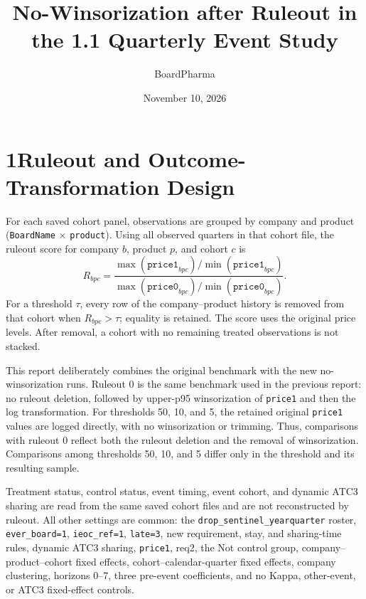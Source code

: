 \documentclass[11pt]{article}
\title{No-Winsorization after Ruleout in the 1.1 Quarterly Event Study}
\author{BoardPharma}
\date{November 10, 2026}
\begin{document}
\maketitle

\section*{1\quad Ruleout and Outcome-Transformation Design}

For each saved cohort panel, observations are grouped by company and product
(\texttt{BoardName} $\times$ \texttt{product}). Using all observed quarters in
that cohort file, the ruleout score for company $b$, product $p$, and cohort $c$
is
\[
R_{bpc}
=
\frac{\max(\texttt{price1}_{bpc})/\min(\texttt{price1}_{bpc})}
     {\max(\texttt{price0}_{bpc})/\min(\texttt{price0}_{bpc})}.
\]
For a threshold $\tau$, every row of the company--product history is removed
from that cohort when $R_{bpc}>\tau$; equality is retained. The score uses the
original price levels. After removal, a cohort with no remaining treated
observations is not stacked.

This report deliberately combines the original benchmark with the new
no-winsorization runs. Ruleout 0 is the same benchmark used in the previous
report: no ruleout deletion, followed by upper-p95 winsorization of
\texttt{price1} and then the log transformation. For thresholds 50, 10, and 5,
the retained original \texttt{price1} values are logged directly, with no
winsorization or trimming. Thus, comparisons with ruleout 0 reflect both the
ruleout deletion and the removal of winsorization. Comparisons among thresholds
50, 10, and 5 differ only in the threshold and its resulting sample.

Treatment status, control status, event timing, event cohort, and dynamic ATC3
sharing are read from the same saved cohort files and are not reconstructed by
ruleout. All other settings are common: the
\texttt{drop\_sentinel\_yearquarter} roster, \texttt{ever\_board=1},
\texttt{ieoc\_ref=1}, \texttt{late=3}, new requirement, stay, and sharing-time
rules, dynamic ATC3 sharing, \texttt{price1}, req2, the Not control group,
company--product--cohort fixed effects, cohort--calendar-quarter fixed effects,
company clustering, horizons 0--7, three pre-event coefficients, and no Kappa,
other-event, or ATC3 fixed-effect controls.
\end{document}
